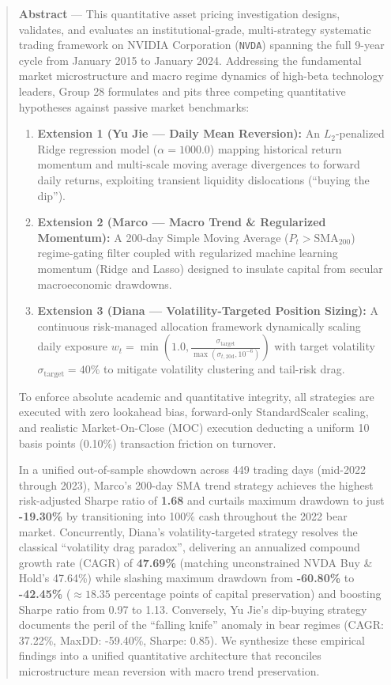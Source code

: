 \documentclass[12pt, a4paper]{article}
\begin{document}
\begin{titlepage}
\end{titlepage}

\newpage
\tableofcontents
\newpage

\begin{abstract}
\textbf{Abstract} --- This quantitative asset pricing investigation designs, validates, and evaluates an institutional-grade, multi-strategy systematic trading framework on NVIDIA Corporation (\texttt{NVDA}) spanning the full 9-year cycle from January 2015 to January 2024. Addressing the fundamental market microstructure and macro regime dynamics of high-beta technology leaders, Group 28 formulates and pits three competing quantitative hypotheses against passive market benchmarks:
\begin{enumerate}
    \item \textbf{Extension 1 (Yu Jie --- Daily Mean Reversion):} An $L_2$-penalized Ridge regression model ($\alpha = 1000.0$) mapping historical return momentum and multi-scale moving average divergences to forward daily returns, exploiting transient liquidity dislocations (``buying the dip'').
    \item \textbf{Extension 2 (Marco --- Macro Trend \& Regularized Momentum):} A 200-day Simple Moving Average ($P_t > \text{SMA}_{200}$) regime-gating filter coupled with regularized machine learning momentum (Ridge and Lasso) designed to insulate capital from secular macroeconomic drawdowns.
    \item \textbf{Extension 3 (Diana --- Volatility-Targeted Position Sizing):} A continuous risk-managed allocation framework dynamically scaling daily exposure $w_t = \min\left(1.0, \frac{\sigma_{\text{target}}}{\max(\sigma_{t, 20\text{d}}, 10^{-6})}\right)$ with target volatility $\sigma_{\text{target}} = 40\%$ to mitigate volatility clustering and tail-risk drag.
\end{enumerate}
To enforce absolute academic and quantitative integrity, all strategies are executed with zero lookahead bias, forward-only StandardScaler scaling, and realistic Market-On-Close (MOC) execution deducting a uniform 10 basis points (0.10\%) transaction friction on turnover. 

In a unified out-of-sample showdown across 449 trading days (mid-2022 through 2023), Marco's 200-day SMA trend strategy achieves the highest risk-adjusted Sharpe ratio of \textbf{1.68} and curtails maximum drawdown to just \textbf{-19.30\%} by transitioning into 100\% cash throughout the 2022 bear market. Concurrently, Diana's volatility-targeted strategy resolves the classical ``volatility drag paradox'', delivering an annualized compound growth rate (CAGR) of \textbf{47.69\%} (matching unconstrained NVDA Buy \& Hold's 47.64\%) while slashing maximum drawdown from \textbf{-60.80\%} to \textbf{-42.45\%} ($\approx 18.35$ percentage points of capital preservation) and boosting Sharpe ratio from 0.97 to 1.13. Conversely, Yu Jie's dip-buying strategy documents the peril of the ``falling knife'' anomaly in bear regimes (CAGR: 37.22\%, MaxDD: -59.40\%, Sharpe: 0.85). We synthesize these empirical findings into a unified quantitative architecture that reconciles microstructure mean reversion with macro trend preservation.
\end{abstract}
\end{document}

